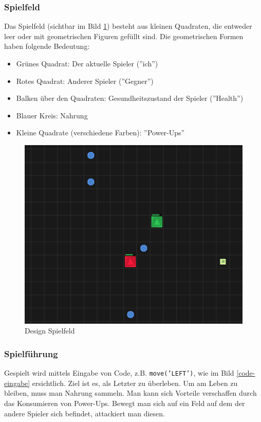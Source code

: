 \documentclass[11pt,a4paper,titlepage]{article}
\begin{document}
\subsubsection{Spielfeld}

Das Spielfeld (sichtbar im Bild \ref{spielfeld}) besteht aus kleinen Quadraten, die entweder leer oder mit geometrischen Figuren gefüllt sind. Die geometrischen Formen haben folgende Bedeutung:
\begin{itemize}
\item Grünes Quadrat: Der aktuelle Spieler (''ich'')
\item Rotes Quadrat: Anderer Spieler (''Gegner'')
\item Balken über den Quadraten: Gesundheitszustand der Spieler (''Health'')
\item Blauer Kreis: Nahrung
\item Kleine Quadrate (verschiedene Farben): ''Power-Ups''
\end{itemize}

\begin{figure}[H]
	\centering
	\includegraphics[width=\textwidth]{game1.png}
	\caption{Design Spielfeld}
	\label{spielfeld}
\end{figure}

\subsubsection{Spielführung}

Gespielt wird mittels Eingabe von Code, z.B. \texttt{move('LEFT')}, wie im Bild \ref{code-eingabe} ersichtlich. Ziel ist es, als Letzter zu überleben. Um am Leben zu bleiben, muss man Nahrung sammeln. Man kann sich Vorteile verschaffen durch das Konsumieren von Power-Ups. Bewegt man sich auf ein Feld auf dem der andere Spieler sich befindet, attackiert man diesen.
\end{document}
